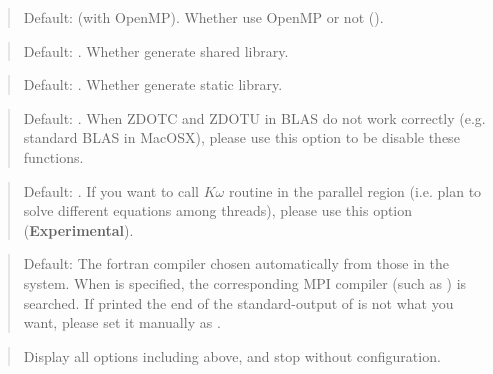 \documentclass[letterpaper,10pt,dvipdfmx,openany]{sphinxmanual}
\begin{document}
\begin{quote}

Default:  (with OpenMP).
Whether use OpenMP or not ().
\end{quote}

\begin{quote}

Default: .
Whether generate shared library.
\end{quote}

\begin{quote}

Default: .
Whether generate static library.
\end{quote}

\begin{quote}

Default: .
When ZDOTC and ZDOTU in BLAS do not work correctly (e.g. standard BLAS in MacOSX),
please use this option to be disable these functions.
\end{quote}

\begin{quote}

Default: .
If you want to call \(K\omega\) routine in the parallel region
(i.e. plan to solve different equations among threads),
please use this option (\textbf{Experimental}).
\end{quote}

\begin{quote}

Default: The fortran compiler chosen automatically from those in the system.
When  is specified, the corresponding MPI compiler
(such as ) is searched.
If  printed the end of the standard-output of  is not
what you want, please set it manually as .
\end{quote}

\begin{quote}

Display all options including above, and stop without configuration.
\end{quote}
\end{document}
